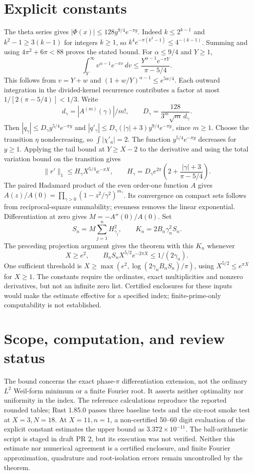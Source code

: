 \documentclass[11pt]{article}
\newcommand{\norm}[1]{\lVert#1\rVert}
\begin{document}
\section{Explicit constants}
The theta series gives $|\Phi(x)|\le128y^{9/4}e^{-\pi y}$. Indeed $k\le2^{k-1}$ and $k^2-1\ge3(k-1)$ for integers $k\ge1$, so $k^4e^{-\pi(k^2-1)}\le4^{-(k-1)}$. Summing and using $4\pi^2+6\pi<88$ proves the stated bound. For $\alpha\le9/4$ and $Y\ge1$,
\[
\int_Y^\infty v^{\alpha-1}e^{-\pi v}\,dv
\le\frac{Y^{\alpha-1}e^{-\pi Y}}{\pi-5/4}.
\]
This follows from $v=Y+w$ and $(1+w/Y)^{\alpha-1}\le e^{5w/4}$. Each outward integration in the divided-kernel recurrence contributes a factor at most $1/[2(\pi-5/4)]<1/3$. Write
\[
d_\gamma=|A^{(m)}(\gamma)|/m!,\qquad D_\gamma=\frac{128}{3^m\sqrt m\,d_\gamma}.
\]
Then $|q_\gamma|\le D_\gamma y^{5/4}e^{-\pi y}$ and $|q'_\gamma|\le D_\gamma(|\gamma|+3)y^{9/4}e^{-\pi y}$, since $m\ge1$. Choose the transition $\eta$ nondecreasing, so $\int|\chi'_a|=2$. The function $y^{5/4}e^{-\pi y}$ decreases for $y\ge1$. Applying the tail bound at $Y\ge X-2$ to the derivative and using the total variation bound on the transition gives
\[
\norm{r'}_1\le H_\gamma X^{5/4}e^{-\pi X},\qquad
H_\gamma=D_\gamma e^{2\pi}\left(2+\frac{|\gamma|+3}{\pi-5/4}\right).
\]
The paired Hadamard product of the even order-one function $A$ gives $A(z)/A(0)=\prod_{\gamma>0}(1-z^2/\gamma^2)^{m_\gamma}$. Its convergence on compact sets follows from reciprocal-square summability; evenness removes the linear exponential. Differentiation at zero gives $M=-A''(0)/A(0)$. Set
\[
S_n=M\sum_{j=1}^n H_{\gamma_j}^2,\qquad K_n=2B_n\gamma_n^2 S_n.
\]
The preceding projection argument gives the theorem with this $K_n$ whenever
\[
X\ge e^2,\qquad B_n S_n X^{5/2}e^{-2\pi X}\le1/(2\gamma_n).
\] One sufficient threshold is $X\ge\max(e^2,\log(2\gamma_n B_n S_n)/\pi)$, using $X^{5/2}\le e^{\pi X}$ for $X\ge1$. The constants require the ordinates, exact multiplicities and nonzero derivatives, but not an infinite zero list. Certified enclosures for these inputs would make the estimate effective for a specified index; finite-prime-only computability is not established.
\section{Scope, computation, and review status}
The bound concerns the exact phase-$\pi$ differentiation extension, not the ordinary $L^2$ Weil-form minimum or a finite Fourier root. It asserts neither optimality nor uniformity in the index. The reference calculations reproduce the reported rounded tables; Rust 1.85.0 passes three baseline tests and the six-root smoke test at $X=3,N=18$. At $X=11,n=1$, a non-certified 50--60 digit evaluation of the explicit constant estimates the upper bound as $3.372\times10^{-11}$. The ball-arithmetic script is staged in draft PR 2, but its execution was not verified. Neither this estimate nor numerical agreement is a certified enclosure, and finite Fourier approximation, quadrature and root-isolation errors remain uncontrolled by the theorem.
\end{document}
